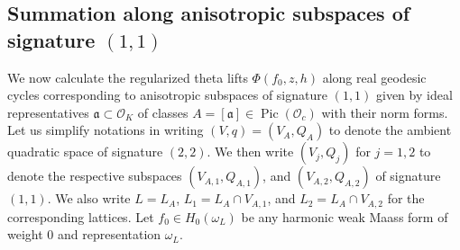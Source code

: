 \documentclass{amsart}
\theoremstyle{definition}
\begin{document}
\subsection{Summation along anisotropic subspaces of signature $(1,1)$} 

We now calculate the regularized theta lifts $\Phi( f_0, z, h)$ along real geodesic cycles corresponding to anisotropic subspaces 
of signature $(1,1)$ given by ideal representatives $\mathfrak{a} \subset \mathcal{O}_K$ of classes $A = [\mathfrak{a}] \in \operatorname{Pic}(\mathcal{O}_c)$ with their norm forms.
Let us simplify notations in writing $(V, q) = (V_A, Q_A)$ to denote the ambient quadratic space of signature $(2,2)$.
We then write $(V_j, Q_j)$ for $j=1,2$ to denote the respective subspaces $(V_{A, 1}, Q_{A, 1})$, and $(V_{A, 2}, Q_{A, 2})$ of signature $(1,1)$. 
We also write $L = L_A$, $L_1 = L_A \cap V_{A, 1}$, and $L_2 = L_A \cap V_{A, 2}$ for the 
corresponding lattices. Let $f_0 \in H_{0}(\omega_L)$ be any harmonic weak Maass form of weight $0$ and representation $\omega_L$. 
\end{document}
